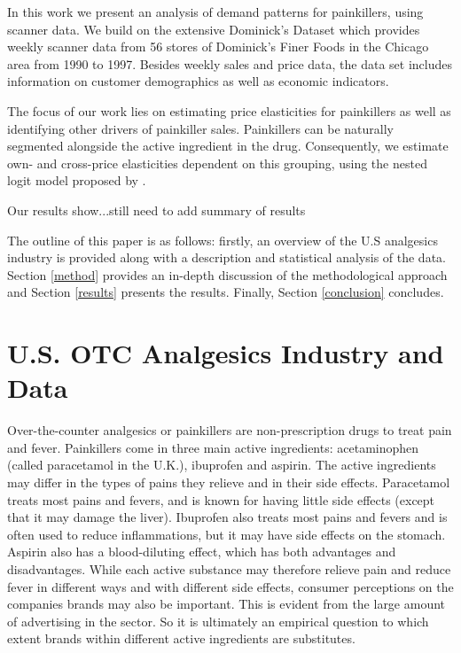 \documentclass[12pt, authoryear]{elsarticle}
\begin{document}
In this work we present an analysis of demand patterns for painkillers, using scanner data. We build on the extensive Dominick’s Dataset which provides weekly scanner data from 56 stores of Dominick’s Finer Foods in the Chicago area from 1990 to 1997. Besides weekly sales and price data, the data set includes information on customer demographics as well as economic indicators.

The focus of our work lies on estimating price elasticities for painkillers as well as identifying other drivers of painkiller sales. Painkillers can be naturally segmented alongside the active ingredient in the drug. Consequently, we estimate own- and cross-price elasticities dependent on this grouping, using the nested logit model proposed by \cite{berry1994estimating}.

Our results show...still need to add summary of results

The outline of this paper is as follows: firstly, an overview of the U.S analgesics industry is provided along with a description and statistical analysis of the data. Section \ref{method}  provides an in-depth discussion of the methodological approach and Section \ref{results} presents the results. Finally, Section \ref{conclusion} concludes.


\section{U.S. OTC Analgesics Industry and Data}\label{data}

Over-the-counter analgesics or painkillers are non-prescription drugs to treat pain and fever.
Painkillers come in three main active ingredients:  acetaminophen (called paracetamol in the
U.K.), ibuprofen and aspirin. The active ingredients may differ in the types
of pains they relieve and in their side effects. Paracetamol treats most pains and fevers, and
is known for having little side effects (except that it may damage the liver). Ibuprofen also
treats most pains and fevers and is often used to reduce inflammations, but it may have
side effects on the stomach. Aspirin also has a blood-diluting effect, which has
both advantages and disadvantages. While each active substance may therefore relieve pain
and reduce fever in different ways and with different side effects, consumer perceptions on
the companies brands may also be important. This is evident from the large amount of
advertising in the sector. So it is ultimately an empirical question to which extent brands
within different active ingredients are substitutes.
\end{document}

